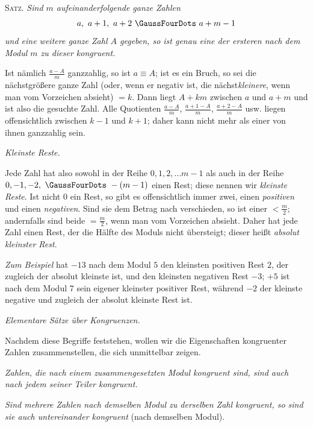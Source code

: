 
\textsc{Satz.} \emph{Sind $m$ aufeinanderfolgende ganze Zahlen}
\[
a,\ a+1,\ a+2\ \GaussFourDots\ a+m-1
\]
\emph{und eine weitere ganze Zahl $A$ gegeben, so ist genau eine der ersteren nach dem Modul $m$ zu dieser kongruent.}

Ist nämlich $\frac{a-A}{m}$ ganzzahlig, so ist $a\equiv A$; ist es ein Bruch, so sei die nächstgrößere ganze Zahl (oder, wenn er negativ ist, die nächst\emph{kleinere}, wenn man vom Vorzeichen absieht) $=k$. Dann liegt $A+km$ zwischen $a$ und $a+m$ und ist also die gesuchte Zahl. Alle Quotienten $\frac{a-A}{m}$, $\frac{a+1-A}{m}$, $\frac{a+2-A}{m}$ usw. liegen offensichtlich zwischen $k-1$ und $k+1$; daher kann nicht mehr als einer von ihnen ganzzahlig sein.

\begin{center}\emph{Kleinste Reste.}\end{center}

Jede Zahl hat also sowohl in der Reihe $0, 1, 2,\ldots m-1$ als auch in der Reihe $0, -1, -2,\ \GaussFourDots\ -(m-1)$ einen Rest; diese nennen wir \emph{kleinste Reste}. Ist nicht $0$ ein Rest, so gibt es offensichtlich immer zwei, einen \emph{positiven} und einen \emph{negativen}. Sind sie dem Betrag nach verschieden, so ist einer $<\frac{m}{2}$; andernfalls sind beide $=\frac{m}{2}$, wenn man vom Vorzeichen absieht. Daher hat jede Zahl einen Rest, der die Hälfte des Moduls nicht übersteigt; dieser heißt \emph{absolut kleinster Rest}.

\emph{Zum Beispiel} hat $-13$ nach dem Modul $5$ den kleinsten positiven Rest $2$, der zugleich der absolut kleinste ist, und den kleinsten negativen Rest $-3$; $+5$ ist nach dem Modul $7$ sein eigener kleinster positiver Rest, während $-2$ der kleinste negative und zugleich der absolut kleinste Rest ist.

\begin{center}\emph{Elementare Sätze über Kongruenzen.}\end{center}

Nachdem diese Begriffe feststehen, wollen wir die Eigenschaften kongruenter Zahlen zusammenstellen, die sich unmittelbar zeigen.

\emph{Zahlen, die nach einem zusammengesetzten Modul kongruent sind, sind auch nach jedem seiner Teiler kongruent.}

\emph{Sind mehrere Zahlen nach demselben Modul zu derselben Zahl kongruent, so sind sie auch untereinander kongruent} (nach demselben Modul).


